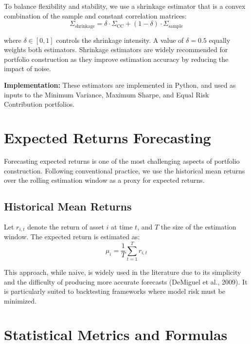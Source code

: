 \documentclass{article}
\begin{document}
To balance flexibility and stability, we use a shrinkage estimator that is a convex combination of the sample and constant correlation matrices:
\[
\Sigma_{\text{shrinkage}} = \delta \cdot \Sigma_{\text{CC}} + (1 - \delta) \cdot \Sigma_{\text{sample}}
\]

where \( \delta \in [0,1] \) controls the shrinkage intensity. A value of \( \delta = 0.5 \) equally weights both estimators. Shrinkage estimators are widely recommended for portfolio construction as they improve estimation accuracy by reducing the impact of noise.

\textbf{Implementation:} These estimators are implemented in Python, and used as inputs to the Minimum Variance, Maximum Sharpe, and Equal Risk Contribution portfolios.



\section{Expected Returns Forecasting}

Forecasting expected returns is one of the most challenging aspects of portfolio construction. Following conventional practice, we use the historical mean returns over the rolling estimation window as a proxy for expected returns.

\subsection{Historical Mean Returns}

Let \( r_{i,t} \) denote the return of asset \( i \) at time \( t \), and \( T \) the size of the estimation window. The expected return is estimated as:
\[
\mu_i = \frac{1}{T} \sum_{t=1}^T r_{i,t}
\]

This approach, while naive, is widely used in the literature due to its simplicity and the difficulty of producing more accurate forecasts (DeMiguel et al., 2009). It is particularly suited to backtesting frameworks where model risk must be minimized.
\newpage


\section{Statistical Metrics and Formulas}
\end{document}
